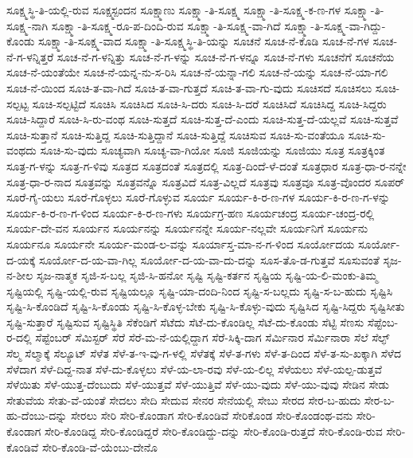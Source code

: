 {ಸೂಕ್ಷ್ಮಸ್ಥಿ-ತಿ-ಯಲ್ಲಿ-ರುವ
ಸೂಕ್ಷ್ಮಸ್ಪಂದನ
ಸೂಕ್ಷ್ಮಾಣು
ಸೂಕ್ಷ್ಮಾ-ತಿ-ಸೂಕ್ಷ್ಮ
ಸೂಕ್ಷ್ಮಾ-ತಿ-ಸೂಕ್ಷ್ಮ-ಕ-ಣ-ಗಳ
ಸೂಕ್ಷ್ಮಾ-ತಿ-ಸೂಕ್ಷ್ಮ-ನಾಗಿ
ಸೂಕ್ಷ್ಮಾ-ತಿ-ಸೂಕ್ಷ್ಮ-ರೂ-ಪ-ದಿಂದಿ-ರುವ
ಸೂಕ್ಷ್ಮಾ-ತಿ-ಸೂಕ್ಷ್ಮ-ವಾ-ಗಿದೆ
ಸೂಕ್ಷ್ಮಾ-ತಿ-ಸೂಕ್ಷ್ಮ-ವಾ-ಗಿದ್ದು-ಕೊಂಡು
ಸೂಕ್ಷ್ಮಾ-ತಿ-ಸೂಕ್ಷ್ಮ-ವಾದ
ಸೂಕ್ಷ್ಮಾ-ತಿ-ಸೂಕ್ಷ್ಮಸ್ಥಿ-ತಿ-ಯನ್ನು
ಸೂಚನೆ
ಸೂಚ-ನೆ-ಕೊಡಿ
ಸೂಚ-ನೆ-ಗಳ
ಸೂಚ-ನೆ-ಗ-ಳನ್ನಿತ್ತರೆ
ಸೂಚ-ನೆ-ಗ-ಳನ್ನಿತ್ತು
ಸೂಚ-ನೆ-ಗ-ಳನ್ನು
ಸೂಚ-ನೆ-ಗ-ಳನ್ನೂ
ಸೂಚ-ನೆ-ಗಳು
ಸೂಚನೆಗೆ
ಸೂಚನೆಯ
ಸೂಚ-ನೆ-ಯಂತೆಯೇ
ಸೂಚ-ನೆ-ಯನ್ನ-ನು-ಸ-ರಿಸಿ
ಸೂಚ-ನೆ-ಯನ್ನಾ-ಗಲಿ
ಸೂಚ-ನೆ-ಯನ್ನು
ಸೂಚ-ನೆ-ಯಾ-ಗಲಿ
ಸೂಚ-ನೆ-ಯಿಂದ
ಸೂಚಿ-ತ-ವಾ-ಗಿದೆ
ಸೂಚಿ-ತ-ವಾ-ಗುತ್ತದೆ
ಸೂಚಿ-ತ-ವಾ-ಗು-ವುದು
ಸೂಚಿಸದೆ
ಸೂಚಿಸಲು
ಸೂಚಿ-ಸಲ್ಪಟ್ಟ
ಸೂಚಿ-ಸಲ್ಪಟ್ಟಿದೆ
ಸೂಚಿಸಿ
ಸೂಚಿಸಿದ
ಸೂಚಿ-ಸಿ-ದರು
ಸೂಚಿ-ಸಿ-ದರೆ
ಸೂಚಿಸಿದೆ
ಸೂಚಿಸಿದ್ದ
ಸೂಚಿ-ಸಿದ್ದರು
ಸೂಚಿ-ಸಿದ್ದಾರೆ
ಸೂಚಿ-ಸಿ-ರು-ವಂಥ
ಸೂಚಿ-ಸುತ್ತದೆ
ಸೂಚಿ-ಸುತ್ತ-ದೆ-ಎಂದು
ಸೂಚಿ-ಸುತ್ತ-ದೆ-ಯಲ್ಲವೆ
ಸೂಚಿ-ಸುತ್ತವೆ
ಸೂಚಿ-ಸುತ್ತಾನೆ
ಸೂಚಿ-ಸುತ್ತಿದ್ದ
ಸೂಚಿ-ಸುತ್ತಿದ್ದಾನೆ
ಸೂಚಿ-ಸುತ್ತಿದ್ದೆ
ಸೂಚಿಸುವ
ಸೂಚಿ-ಸು-ವಂತೆಯೂ
ಸೂಚಿ-ಸು-ವಂಥದು
ಸೂಚಿ-ಸು-ವುದು
ಸೂಚ್ಯವಾಗಿ
ಸೂಚ್ಯ-ವಾ-ಗಿಯೋ
ಸೂಜಿ
ಸೂಜಿಯನ್ನು
ಸೂಜಿಯು
ಸೂತ್ರ
ಸೂತ್ರಕ್ಕಿಂತ
ಸೂತ್ರ-ಗ-ಳನ್ನು
ಸೂತ್ರ-ಗ-ಳಿವು
ಸೂತ್ರದ
ಸೂತ್ರದಂತೆ
ಸೂತ್ರದಲ್ಲಿ
ಸೂತ್ರ-ದಿಂದೆ-ಳೆ-ದಂತೆ
ಸೂತ್ರಧಾರ
ಸೂತ್ರ-ಧಾ-ರ-ನನ್ನೇ
ಸೂತ್ರ-ಧಾ-ರ-ನಾದ
ಸೂತ್ರವನ್ನು
ಸೂತ್ರವನ್ನೊ
ಸೂತ್ರವಿದೆ
ಸೂತ್ರ-ವಿಲ್ಲದೆ
ಸೂತ್ರವು
ಸೂತ್ರವೂ
ಸೂತ್ರ-ವೊಂದರ
ಸೂಪರ್
ಸೂರೆ-ಗೈ-ಯಲು
ಸೂರೆ-ಗೊಳ್ಳಲು
ಸೂರೆ-ಗೊಳ್ಳುವ
ಸೂರ್ಯ
ಸೂರ್ಯ-ಕಿ-ರ-ಣ-ಗಳ
ಸೂರ್ಯ-ಕಿ-ರ-ಣ-ಗ-ಳನ್ನು
ಸೂರ್ಯ-ಕಿ-ರ-ಣ-ಗ-ಳಿಂದ
ಸೂರ್ಯ-ಕಿ-ರ-ಣ-ಗಳು
ಸೂರ್ಯಗ್ರ-ಹಣ
ಸೂರ್ಯಚಂದ್ರ
ಸೂರ್ಯ-ಚಂದ್ರ-ರಲ್ಲಿ
ಸೂರ್ಯ-ದೇ-ವನ
ಸೂರ್ಯನ
ಸೂರ್ಯನನ್ನು
ಸೂರ್ಯನನ್ನೇ
ಸೂರ್ಯ-ನಲ್ಲವೇ
ಸೂರ್ಯನಿಗೆ
ಸೂರ್ಯನು
ಸೂರ್ಯನೂ
ಸೂರ್ಯನೇ
ಸೂರ್ಯ-ಮಂಡ-ಲ-ವನ್ನು
ಸೂರ್ಯಾಸ್ತ-ಮಾ-ನ-ಗ-ಳಿಂದ
ಸೂರ್ಯೋದಯ
ಸೂರ್ಯೋ-ದ-ಯಕ್ಕೆ
ಸೂರ್ಯೋ-ದ-ಯ-ವಾ-ಗಿಲ್ಲ
ಸೂರ್ಯೋ-ದ-ಯ-ವಾ-ದು-ದನ್ನು
ಸೂಸ-ತೊ-ಡ-ಗುತ್ತವೆ
ಸೂಸುವಂತೆ
ಸೃಜ-ನ-ಶೀಲ
ಸೃಜ-ನಾತ್ಮಕ
ಸೃಜಿ-ಸ-ಬಲ್ಲ
ಸೃಜಿ-ಸಿ-ಹನೋ
ಸೃಷ್ಟಿ
ಸೃಷ್ಟಿ-ಕರ್ತನ
ಸೃಷ್ಟಿಯ
ಸೃಷ್ಟಿ-ಯ-ಲಿ-ಮಂಕು-ತಿಮ್ಮ
ಸೃಷ್ಟಿಯಲ್ಲಿ
ಸೃಷ್ಟಿ-ಯಲ್ಲಿ-ರುವ
ಸೃಷ್ಟಿಯಲ್ಲೂ
ಸೃಷ್ಟಿ-ಯಾ-ದಂದಿ-ನಿಂದ
ಸೃಷ್ಟಿ-ಸ-ಬಲ್ಲದು
ಸೃಷ್ಟಿ-ಸ-ಬ-ಹುದು
ಸೃಷ್ಟಿಸಿ
ಸೃಷ್ಟಿ-ಸಿ-ಕೊಂಡಿದೆ
ಸೃಷ್ಟಿ-ಸಿ-ಕೊಂಡು
ಸೃಷ್ಟಿ-ಸಿ-ಕೊಳ್ಳ-ಬೇಕು
ಸೃಷ್ಟಿ-ಸಿ-ಕೊಳ್ಳು-ವುದು
ಸೃಷ್ಟಿಸಿದ
ಸೃಷ್ಟಿ-ಸಿದ್ದರು
ಸೃಷ್ಟಿಸೀತು
ಸೃಷ್ಟಿ-ಸುತ್ತಾರೆ
ಸೃಷ್ಟಿಸುವ
ಸೃಷ್ಟಿಸ್ಥಿತಿ
ಸೆಕೆಂಡಿಗೆ
ಸೆಟೆದು
ಸೆಟೆ-ದು-ಕೊಂಡಿಲ್ಲ
ಸೆಟೆ-ದು-ಕೊಂಡು
ಸೆಟ್ಟಿ
ಸೆಣಸು
ಸೆಪ್ಟೆಂಬ-ರ-ದಲ್ಲಿ
ಸೆಪ್ಟೆಂಬರ್
ಸೆಮಿಸ್ಟರ್
ಸೆರೆ
ಸೆರೆ-ಮ-ನೆ-ಯಲ್ಲಿದ್ದಾಗ
ಸೆರೆ-ಸಿಕ್ಕಿ-ದಾಗ
ಸೆರ್ಮಿನಾರ
ಸೆರ್ಮಿನಾರಾ
ಸೆಲೆ
ಸೆಲ್ಫ್
ಸೆಲ್ಮ
ಸೆಲ್ಮಾಕ್ಕೆ
ಸೆಲ್ಯೂಟ್
ಸೆಳೆತ
ಸೆಳೆ-ತ-ಇ-ವು-ಗ-ಳಲ್ಲಿ
ಸೆಳೆತಕ್ಕೆ
ಸೆಳೆ-ತ-ಗಳು
ಸೆಳೆ-ತ-ದಿಂದ
ಸೆಳೆ-ತ-ಸು-ಖಕ್ಕಾಗಿ
ಸೆಳೆದ
ಸೆಳೆದಾಗ
ಸೆಳೆ-ದಿದ್ದ-ನಾತ
ಸೆಳೆ-ದು-ಕೊಳ್ಳಲು
ಸೆಳೆ-ಯ-ಲಾ-ರವು
ಸೆಳೆ-ಯ-ಲಿಲ್ಲ
ಸೆಳೆಯಲು
ಸೆಳೆ-ಯಲ್ಪ-ಡುತ್ತವೆ
ಸೆಳೆಯಿತು
ಸೆಳೆ-ಯುತ್ತ-ದೆಂಬುದು
ಸೆಳೆ-ಯುತ್ತವೆ
ಸೆಳೆ-ಯುತ್ತಿವೆ
ಸೆಳೆ-ಯು-ವುದು
ಸೆಳೆ-ಯು-ವುವು
ಸೇಡಿನ
ಸೇಡು
ಸೇತುವೆಯ
ಸೇತು-ವೆ-ಯಂತೆ
ಸೇದಲು
ಸೇದಿ
ಸೇದುವ
ಸೇನರ
ಸೇನೆಯಲ್ಲಿ
ಸೇಬು
ಸೇರದ
ಸೇರ-ಬ-ಹುದು
ಸೇರ-ಬ-ಹು-ದೆಂಬು-ದನ್ನು
ಸೇರಲು
ಸೇರಿ
ಸೇರಿ-ಕೊಂಡಾಗ
ಸೇರಿ-ಕೊಂಡಿವೆ
ಸೇರಿಕೊಂಡ
ಸೇರಿ-ಕೊಂಡಂಥ-ವನು
ಸೇರಿ-ಕೊಂಡಾಗ
ಸೇರಿ-ಕೊಂಡಿದ್ದ
ಸೇರಿ-ಕೊಂಡಿದ್ದರೆ
ಸೇರಿ-ಕೊಂಡಿದ್ದು-ದನ್ನು
ಸೇರಿ-ಕೊಂಡಿ-ರುತ್ತದೆ
ಸೇರಿ-ಕೊಂಡಿ-ರುವ
ಸೇರಿ-ಕೊಂಡಿವೆ
ಸೇರಿ-ಕೊಂಡಿ-ವೆ-ಯೆಂಬು-ದೇನೊ
}
